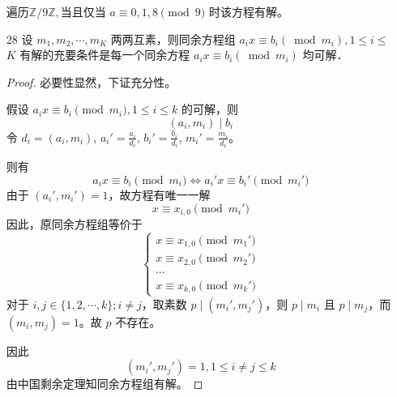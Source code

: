 \begin{enumerate}
\begin{solution}
    遍历$\mathbb{Z} / 9 \mathbb{Z},$当且仅当 $a \equiv 0, 1, 8 \pmod{9}$ 时该方程有解。
\end{solution}

    \item[28] 设 $m_1, m_2, \cdots, m_K$ 两两互素，则同余方程组 $a_i x \equiv b_i\left(\bmod m_i\right), 1 \leqslant i \leqslant$ $K$ 有解的充要条件是每一个同余方程 $a_i x \equiv b_i\left(\bmod m_i\right)$ 均可解．
    
    \begin{proof}
        必要性显然，下证充分性。
        
        假设 $a_i x \equiv b_i \pmod{m_i}, 1 \leq i \leq k$ 的可解，则
        \begin{equation*}
            (a_i, m_i) \mid b_i
        \end{equation*}
        令 $d_i = (a_i, m_i)$, $a_i' = \frac{a_i}{d_i}$, $b_i' = \frac{b_i}{d_i}$, $m_i' = \frac{m_i}{d_i}$。
        
        则有
        \begin{equation*}
            a_i x \equiv b_i \pmod{m_i} \Leftrightarrow a_i' x \equiv b_i' \pmod{m_i'}
        \end{equation*}
        由于 $(a_i', m_i') = 1$，故方程有唯一一解
        \begin{equation*}
            x \equiv x_{i,0} \pmod{m_i'}
        \end{equation*}
        因此，原同余方程组等价于
        \begin{equation*}
            \begin{cases}
                x \equiv x_{1,0} \pmod{m_1'} \\
                x \equiv x_{2,0} \pmod{m_2'} \\
                \cdots \\
                x \equiv x_{k,0} \pmod{m_k'}
                \end{cases}
        \end{equation*}
        对于 $i, j \in \{1, 2, \cdots, k\}; i \neq j$，取素数 $p \mid (m_i', m_j')$，则
        $p \mid m_i$ 且 $p \mid m_j$，而 $(m_i, m_j) = 1$。故 $p$ 不存在。
        
        因此
        \begin{equation*}
            (m_i', m_j') = 1, 1 \leq i \neq j \leq k
        \end{equation*}
        由中国剩余定理知同余方程组有解。
    \end{proof}


\end{enumerate}
